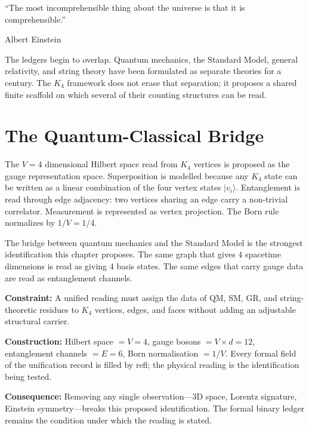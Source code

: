 \documentclass[11pt,a4paper]{book}
\def\texttt#1{#1}%
\begin{document}
\epigraph{``The most incomprehensible thing about the universe is that it is comprehensible.''}{Albert Einstein}

The ledgers begin to overlap. Quantum mechanics, the Standard Model, general relativity, and string theory have been formulated as separate theories for a century. The $K_4$ framework does not erase that separation; it proposes a shared finite scaffold on which several of their counting structures can be read.

\section{The Quantum-Classical Bridge}
\label{sec:qm-sm-bridge}

The $V = 4$ dimensional Hilbert space read from $K_4$ vertices is proposed as the gauge representation space. Superposition is modelled because any $K_4$ state can be written as a linear combination of the four vertex states $|v_i\rangle$. Entanglement is read through edge adjacency: two vertices sharing an edge carry a non-trivial correlator. Measurement is represented as vertex projection. The Born rule normalizes by $1/V = 1/4$.

The bridge between quantum mechanics and the Standard Model is the strongest identification this chapter proposes. The same graph that gives $4$ spacetime dimensions is read as giving $4$ basis states. The same edges that carry gauge data are read as entanglement channels.

\textbf{Constraint:} A unified reading must assign the data of QM, SM, GR, and string-theoretic residues to $K_4$ vertices, edges, and faces without adding an adjustable structural carrier.

\textbf{Construction:} Hilbert space $= V = 4$, gauge bosons $= V \times d = 12$, entanglement channels $= E = 6$, Born normalisation $= 1/V$. Every formal field of the unification record is filled by \texttt{refl}; the physical reading is the identification being tested.

\textbf{Consequence:} Removing any single observation---3D space, Lorentz signature, Einstein symmetry---breaks this proposed identification. The formal binary ledger remains the condition under which the reading is stated.
\end{document}
